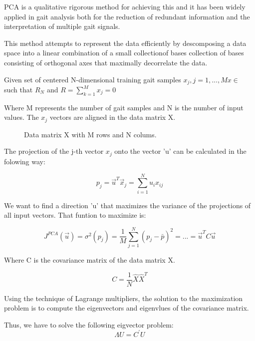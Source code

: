PCA is a qualitative rigorous method for achieving this and it has been widely applied in gait analysis both for the reduction of redundant information and the interpretation of multiple gait signals\cite{PCA}.

This method attempts to represent the data efficiently by descomposing a data space into a linear combination of a small collectionof bases collection of bases consisting of orthogonal axes that maximally decorrelate the data\cite{Jeon}.

Given  set of centered N-dimensional training gait samples 
$ x_{j}, j=1,...,M     x \in$ such that $ R_{N} $ and $ R=\sum_{k=1}^{M}x_{j}=0 $
	
Where M represents the number of gait samples and N is the number of input values. The $ x_{j} $ vectors are aligned in the data matrix X.
\begin{figure}[H]
	\centering
	\caption{Data matrix X with M rows and N colums.}
	\label{fig:matrixPCA}
\end{figure}

The projection of the j-th vector $ x_{j} $ onto the vector 'u' can be calculated in the folowing way:

\begin{equation}
	\label{projections}
	p_{j}=\overrightarrow{u}^{T}\overrightarrow{x}_{j}=\sum_{i=1}^{N}u_{i}x_{ij}	
\end{equation}

We want to find a direction 'u' that maximizes the variance of the projections of all input vectors. That funtion to maximize is:

\begin{equation}
	\label{maxfunction}
	J^{PCA}(\overrightarrow{u})=\sigma^{2}(p_{j})=\dfrac{1}{M}\sum_{j=1}^{N}(p_{j}-\bar{p})^{2}=...=\overrightarrow{u}^{T}C\overrightarrow{u}	
\end{equation}

Where C is the covariance matrix of the data matrix X.

$$C=\dfrac{1}{N}\hat{X}\hat{X}^{T}$$

Using the technique of Lagrange multipliers, the solution to the maximization problem is to compute the eigenvectors and eigenvlues of the covariance matrix.

Thus, we have to solve the following eigvector problem:
\begin{equation}
	\label{eigenproblem}
	\Lambda U=C^{'} U
\end{equation}

